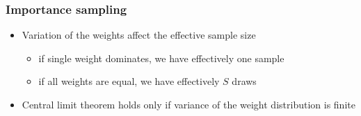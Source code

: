 \documentclass[10pt]{beamer}
\begin{document}
\begin{frame}

\frametitle{Importance sampling}

  \begin{itemize}
  \item Variation of the weights affect the {\color{uured} effective sample size}
    \begin{itemize}
    \item if single weight dominates, we have effectively one sample
    \item if all weights are equal, we have effectively $S$ draws
    \end{itemize}
    \pause
  \item Central limit theorem holds only if variance of the weight
    distribution is finite
  \end{itemize}

\end{frame}
\end{document}
